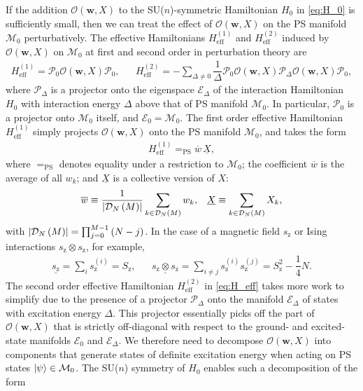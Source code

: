 \documentclass[nofootinbib,notitlepage,11pt]{revtex4-2}
\renewcommand{\t}{\text} %
\newcommand{\f}[2]{\dfrac{#1}{#2}} %
\newcommand{\p}[1]{\left(#1\right)} %
\newcommand{\m}{\bm} %
\newcommand{\1}{\mathds{1}}
\newcommand{\z}{\text{z}}
\newcommand{\D}{\mathcal{D}}
\newcommand{\E}{\mathcal{E}}
\newcommand{\M}{\mathcal{M}}
\renewcommand{\O}{\mathcal{O}}
\renewcommand{\P}{\mathcal{P}}
\newcommand{\EQPS}{=_{\text{PS}}}
\newcommand{\col}{\underline}
\newcommand{\mean}{\overline}
\begin{document}
If the addition $\O\p{\m w,X}$ to the SU($n$)-symmetric Hamiltonian
$H_0$ in \eqref{eq:H_0} is sufficiently small, then we can treat the
effect of $\O\p{\m w,X}$ on the PS manifold $\M_0$ perturbatively.
The effective Hamiltonians $H_{\t{eff}}^{(1)}$ and $H_{\t{eff}}^{(2)}$
induced by $\O\p{\m w,X}$ on $\M_0$ at first and second order in
perturbation theory are\cite{bravyi2011schrieffer}
\begin{align}
  H_{\t{eff}}^{(1)} = \P_0 \O\p{\m w,X} \P_0,
  &&
  H_{\t{eff}}^{(2)} = - \sum_{\Delta\ne0}
  \f1\Delta \P_0 \O\p{\m w,X} \P_\Delta \O\p{\m w,X} \P_0,
  \label{eq:H_eff}
\end{align}
where $\P_\Delta$ is a projector onto the eigenspace $\E_\Delta$ of
the interaction Hamiltonian $H_0$ with interaction energy $\Delta$
above that of PS manifold $\M_0$.  In particular, $\P_0$ is a
projector onto $\M_0$ itself, and $\E_0=\M_0$.  The first order
effective Hamiltonian $H_{\t{eff}}^{(1)}$ simply projects
$\O\p{\m w,X}$ onto the PS manifold $\M_0$, and takes the form
\begin{align}
  H_{\t{eff}}^{(1)} \EQPS \mean w \, \col X,
  \label{eq:H_eff_1}
\end{align}
where $\EQPS$ denotes equality under a restriction to $\M_0$; the
coefficient $\mean w$ is the average of all $w_k$; and $\col X$ is a
collective version of $X$:
\begin{align}
  \mean w \equiv \f1{\abs{\D_N\p{M}}}
  \sum_{k\in\D_N\p{M}} w_k,
  &&
  \col X \equiv \sum_{k\in\D_N\p{M}} X_k,
\end{align}
with $\abs{\D_N\p{M}}=\prod_{j=0}^{M-1}\p{N-j}$.  In the case of a
magnetic field $s_\z$ or Ising interactions $s_\z\otimes s_\z$, for
example,
\begin{align}
  \col{s_\z} = \sum_i s_\z^{(i)} = S_\z,
  &&
  \col{s_\z\otimes s_\z}
  = \sum_{i\ne j} s_\z^{(i)} s_\z^{(j)}
  = S_\z^2 - \f14 N.
\end{align}
The second order effective Hamiltonian $H_{\t{eff}}^{(2)}$ in
\eqref{eq:H_eff} takes more work to simplify due to the presence of a
projector $\P_\Delta$ onto the manifold $\E_\Delta$ of states with
excitation energy $\Delta$.  This projector essentially picks off the
part of $\O\p{\m w,X}$ that is strictly off-diagonal with respect to
the ground- and excited-state manifolds $\E_0$ and $\E_\Delta$.  We
therefore need to decompose $\O\p{\m w,X}$ into components that
generate states of definite excitation energy when acting on PS states
$\ket\psi\in\M_0$.  The SU($n$) symmetry of $H_0$ enables such a
decomposition of the form
\end{document}
